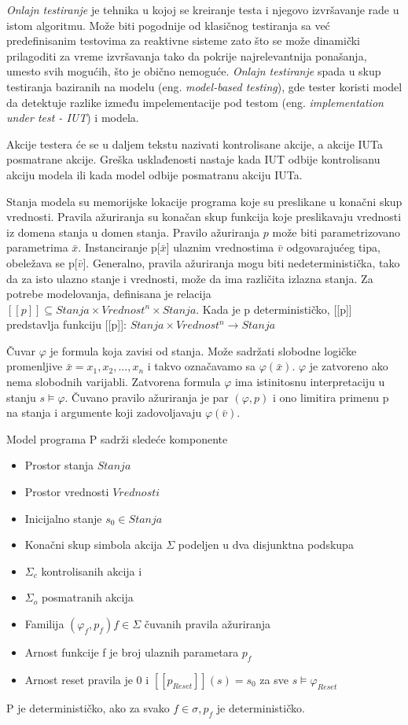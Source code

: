 \documentclass[a4paper]{article}
\theoremstyle{definition}
\begin{document}
{\emph{Onlajn testiranje} je tehnika u kojoj se kreiranje testa i njegovo izvršavanje rade u istom algoritmu. Može biti pogodnije od klasičnog testiranja sa već predefinisanim testovima za reaktivne sisteme zato što se može dinamički prilagoditi za vreme izvršavanja tako da pokrije najrelevantnija ponašanja, umesto svih mogućih, što je obično nemoguće. \emph{Onlajn testiranje} spada u skup testiranja baziranih na modelu (eng. \emph{model-based testing}), gde tester koristi model da detektuje razlike između impelementacije pod testom (eng. \emph{implementation under test - IUT}) i modela.

Akcije testera će se u daljem tekstu nazivati kontrolisane akcije, a akcije IUTa posmatrane akcije. Greška usklađenosti nastaje kada IUT odbije kontrolisanu akciju modela ili kada model odbije posmatranu akciju IUTa.

Stanja modela su memorijske lokacije programa koje su preslikane u konačni skup vrednosti. 
Pravila ažuriranja su konačan skup funkcija koje preslikavaju vrednosti iz domena stanja u domen stanja. Pravilo ažuriranja $p$ može biti parametrizovano parametrima $\bar{x}$.
Instanciranje p[$\bar{x}$] ulaznim vrednostima $\bar{v}$ odgovarajućeg tipa, obeležava se p[$\bar{v}$].
Generalno, pravila ažuriranja mogu biti nedeterministička, tako da za isto ulazno stanje i vrednosti, može da ima različita izlazna stanja. Za potrebe modelovanja, definisana je relacija $[[p]] \subseteq Stanja \times Vrednost^n \times Stanja$.
Kada je p determinističko, [[p]] predstavlja funkciju [[p]]: $Stanja \times Vrednost^n  \rightarrow Stanja$

Čuvar $\varphi$ je formula koja zavisi od stanja. Može sadržati slobodne logičke promenljive $\bar{x} = x_1, x_2,..., x_n$ i takvo označavamo sa $\varphi(\bar{x})$. $\varphi$ je zatvoreno ako nema slobodnih varijabli. Zatvorena formula $\varphi$ ima istinitosnu interpretaciju u stanju $s \models \varphi$. Čuvano pravilo ažuriranja je par $(\varphi, p)$ i ono limitira primenu p na stanja i argumente koji zadovoljavaju $\varphi(\bar{v})$.

Model programa P sadrži sledeće komponente
\begin{itemize}
\item Prostor stanja $Stanja$
\item Prostor vrednosti $Vrednosti$
\item Inicijalno stanje $s_0 \in Stanja$
\item Konačni skup simbola akcija $\Sigma$ podeljen u dva disjunktna podskupa
	\item $\Sigma_c$ kontrolisanih akcija i
	\item $\Sigma_o$ posmatranih akcija
\item Familija $(\varphi_f, p_f) f \in \Sigma$ čuvanih pravila ažuriranja
	\item Arnost funkcije f je broj ulaznih parametara $p_f$
	\item Arnost reset pravila je 0 i $[[p_{Reset}]](s) = s_0$ za sve $s \models \varphi_{Reset}$
\end{itemize}
P je determinističko, ako za svako $f \in \sigma, p_f$ je determinističko. \\

}
\end{document}
